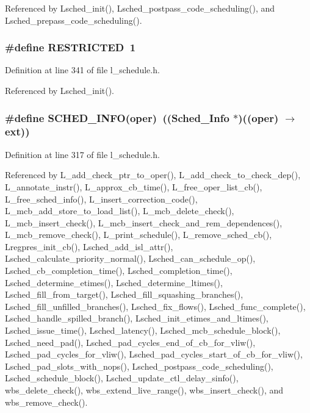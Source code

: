 Referenced by Lsched\_\-init(), Lsched\_\-postpass\_\-code\_\-scheduling(), and Lsched\_\-prepass\_\-code\_\-scheduling().
\subsubsection{\setlength{\rightskip}{0pt plus 5cm}\#define RESTRICTED~1}\label{l__schedule_8h_edb0804dfadf0c8d668cab284168494f}




Definition at line 341 of file l\_\-schedule.h.

Referenced by Lsched\_\-init().
\subsubsection{\setlength{\rightskip}{0pt plus 5cm}\#define SCHED\_\-INFO(oper)~((\bf{Sched\_\-Info} $\ast$)((oper) $\rightarrow$ ext))}\label{l__schedule_8h_a250be9242d11e63322214859df40491}




Definition at line 317 of file l\_\-schedule.h.

Referenced by L\_\-add\_\-check\_\-ptr\_\-to\_\-oper(), L\_\-add\_\-check\_\-to\_\-check\_\-dep(), L\_\-annotate\_\-instr(), L\_\-approx\_\-cb\_\-time(), L\_\-free\_\-oper\_\-list\_\-cb(), L\_\-free\_\-sched\_\-info(), L\_\-insert\_\-correction\_\-code(), L\_\-mcb\_\-add\_\-store\_\-to\_\-load\_\-list(), L\_\-mcb\_\-delete\_\-check(), L\_\-mcb\_\-insert\_\-check(), L\_\-mcb\_\-insert\_\-check\_\-and\_\-rem\_\-dependences(), L\_\-mcb\_\-remove\_\-check(), L\_\-print\_\-schedule(), L\_\-remove\_\-sched\_\-cb(), Lregpres\_\-init\_\-cb(), Lsched\_\-add\_\-isl\_\-attr(), Lsched\_\-calculate\_\-priority\_\-normal(), Lsched\_\-can\_\-schedule\_\-op(), Lsched\_\-cb\_\-completion\_\-time(), Lsched\_\-completion\_\-time(), Lsched\_\-determine\_\-etimes(), Lsched\_\-determine\_\-ltimes(), Lsched\_\-fill\_\-from\_\-target(), Lsched\_\-fill\_\-squashing\_\-branches(), Lsched\_\-fill\_\-unfilled\_\-branches(), Lsched\_\-fix\_\-flows(), Lsched\_\-func\_\-complete(), Lsched\_\-handle\_\-spilled\_\-branch(), Lsched\_\-init\_\-etimes\_\-and\_\-ltimes(), Lsched\_\-issue\_\-time(), Lsched\_\-latency(), Lsched\_\-mcb\_\-schedule\_\-block(), Lsched\_\-need\_\-pad(), Lsched\_\-pad\_\-cycles\_\-end\_\-of\_\-cb\_\-for\_\-vliw(), Lsched\_\-pad\_\-cycles\_\-for\_\-vliw(), Lsched\_\-pad\_\-cycles\_\-start\_\-of\_\-cb\_\-for\_\-vliw(), Lsched\_\-pad\_\-slots\_\-with\_\-nops(), Lsched\_\-postpass\_\-code\_\-scheduling(), Lsched\_\-schedule\_\-block(), Lsched\_\-update\_\-ctl\_\-delay\_\-sinfo(), wbs\_\-delete\_\-check(), wbs\_\-extend\_\-live\_\-range(), wbs\_\-insert\_\-check(), and wbs\_\-remove\_\-check().
